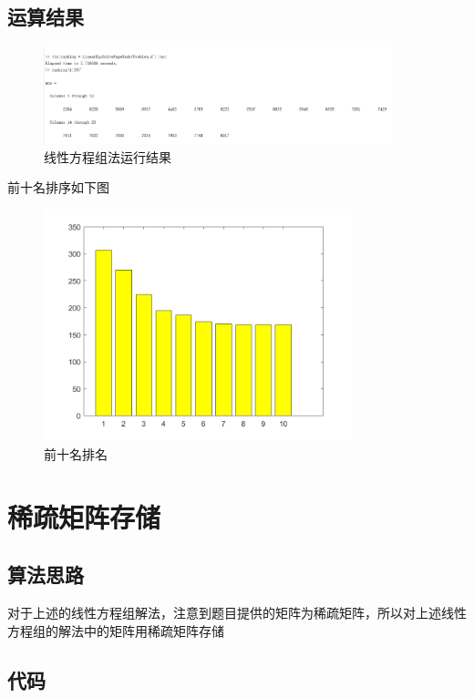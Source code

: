 \documentclass[a4paper,left=2.5cm,right=2.5cm]{article}
\begin{document}
\begin{spacing}{1.6}
	\subsection{运算结果}
	\begin{figure}[H]
		\includegraphics[width=0.9\textwidth]{image/LinearEqsSolvePageRank.png}
		\caption{线性方程组法运行结果}
	\end{figure}
	前十名排序如下图
	
	\begin{figure}[H]				\includegraphics[width=0.8\textwidth]{image/ranking.png}
		\caption{前十名排名}
	\end{figure}
	\section{稀疏矩阵存储}
	\subsection{算法思路}
	对于上述的线性方程组解法，注意到题目提供的矩阵为稀疏矩阵，所以对上述线性方程组的解法中的矩阵用稀疏矩阵存储
	\subsection{代码}
	

\end{spacing}
\end{document}
